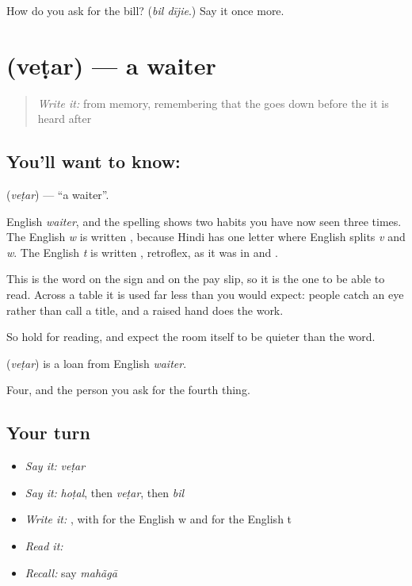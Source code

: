 \begin{tcolorbox}[breakable,colback=teal!4,colframe=teal!35!black,title={Before you move on}]
How do you ask for the bill? (\emph{bil dījie}.) Say it once more.
\end{tcolorbox}
\section[\texorpdfstring{\hi{वेटर} (veṭar)}{वेटर (veṭar)}]{ (veṭar) — a waiter}

\label{lesson:HI-C73-waiter}



\begin{quote}
\emph{Write it:} \textbf{} from memory, remembering that the  goes down before the  it is heard after
\end{quote}

\subsection*{You'll want to know: }
\textbf{} (\emph{veṭar}) — \textquotedblleft{}a waiter\textquotedblright{}.

English \emph{waiter}, and the spelling shows two habits you have now seen three times. The English \emph{w} is written , because Hindi has one letter where English splits \emph{v} and \emph{w}. The English \emph{t} is written , retroflex, as it was in \textbf{} and \textbf{}.

This is the word on the sign and on the pay slip, so it is the one to be able to read. Across a table it is used far less than you would expect: people catch an eye rather than call a title, and a raised hand does the work.

So hold  for reading, and expect the room itself to be quieter than the word.

\begin{cousinweb}
\textbf{} (\emph{veṭar}) is a loan from English \emph{waiter}.
\end{cousinweb}

\begin{grammarlens}[title={What you've built}]
Four, and the person you ask for the fourth thing.
\end{grammarlens}

\subsection*{Your turn}
\begin{itemize}
\raggedright
  \item \emph{Say it:} \emph{veṭar}
  \item \emph{Say it:} \emph{hoṭal}, then \emph{veṭar}, then \emph{bil}
  \item \emph{Write it:} , with  for the English w and  for the English t
  \item \emph{Read it:} \textbf{}
  \item \emph{Recall:} say \emph{mahãgā}
\end{itemize}

